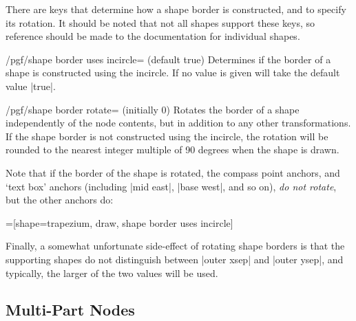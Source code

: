 There are \pgfname{} keys that determine how a shape border is
constructed, and to specify its rotation.
It should be noted that not all shapes support these keys, so
reference should be made to the documentation for individual
shapes.
	
\begin{key}{/pgf/shape border uses incircle=
    (default true)}
  Determines if the border of a shape is constructed using the
  incircle. If no value is given  will take the default
  value |true|.
\end{key}


\begin{key}{/pgf/shape border rotate= (initially 0)}
  Rotates the border of a shape independently of the node contents,
  but in addition to any other transformations. If the shape
  border is not constructed using the incircle, the rotation will be
  rounded to the nearest integer multiple of 90 degrees when the
  shape is drawn.
\end{key}

Note that if the border of the shape is rotated,
the compass point anchors, and `text box' anchors (including
|mid east|, |base west|, and so on), \emph{do not rotate}, but the
other anchors do:
	
\begin{codeexample}[]
=[shape=trapezium, draw, shape border uses incircle]
\end{codeexample}

Finally, a somewhat unfortunate side-effect of rotating shape borders
is that the supporting shapes do not distinguish between
|outer xsep| and |outer ysep|, and typically, the larger of the
two values will be used.




\subsection{Multi-Part Nodes}

\label{section-nodes-multi}

